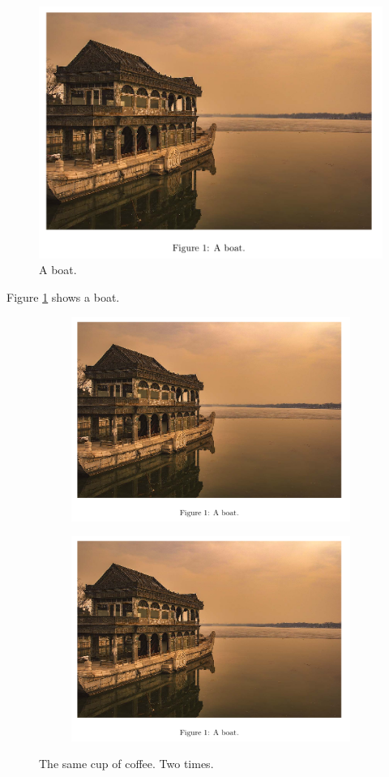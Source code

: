 \documentclass{article}
\begin{document}
\begin{figure}[h]
    \centering
    \includegraphics[width=0.4\linewidth]{boat.png}
    \caption{A boat.}
    \label{fig:boat1}
\end{figure}

Figure \ref{fig:boat1} shows a boat.

\begin{figure}[h]
    \centering
    \begin{subfigure}{0.4\linewidth}
        \includegraphics[width=\linewidth]{boat.png}
    \end{subfigure}
    \begin{subfigure}{0.4\linewidth}
        \includegraphics[width=\linewidth]{boat.png}
    \end{subfigure}
    \caption{The same cup of coffee. Two times.}
    \label{fig:coffee}
\end{figure}
\end{document}
